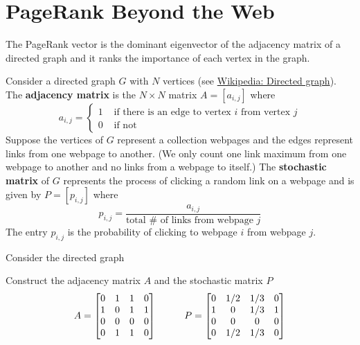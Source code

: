 \section{PageRank Beyond the Web}

\begin{bigidea}
The PageRank vector is the dominant eigenvector of the adjacency matrix of a directed graph and it ranks the importance of each vertex in the graph.
\end{bigidea}

\begin{definition}
Consider a directed graph $G$ with $N$ vertices (see \href{https://en.wikipedia.org/wiki/Directed_graph}{Wikipedia: Directed graph}). The {\bf adjacency matrix} is the $N \times N$ matrix $A = [a_{i,j}]$ where
$$
a_{i,j} = \left\{ \begin{array}{cc} 1 & \text{ if there is an edge to vertex $i$ from vertex $j$} \\ 0 & \text{ if not } \end{array} \right.
$$
Suppose the vertices of $G$ represent a collection webpages and the edges represent links from one webpage to another. (We only count one link maximum from one webpage to another and no links from a webpage to itself.) The {\bf stochastic matrix} \cite[p.134]{KN} of $G$ represents the process of clicking a random link on a webpage and is given by $P = [p_{i,j}]$ where
$$
p_{i,j} = \frac{a_{i,j}}{\text{total $\#$ of links from webpage $j$}}
$$
The entry $p_{i,j}$ is the probability of clicking to webpage $i$ from webpage $j$.
\end{definition}

\begin{example}
Consider the directed graph
\begin{center}
\end{center}
Construct the adjacency matrix $A$ and the stochastic matrix $P$
$$
A = \begin{bmatrix} 0 & 1 & 1 & 0 \\ 1 & 0 & 1 & 1 \\ 0 & 0 & 0 & 0 \\ 0 & 1 & 1 & 0 \end{bmatrix}
\hspace{10mm}
P = \begin{bmatrix} 0 & 1/2 & 1/3 & 0 \\ 1 & 0 & 1/3 & 1 \\ 0 & 0 & 0 & 0 \\ 0 & 1/2 & 1/3 & 0 \end{bmatrix}
$$
\end{example}

